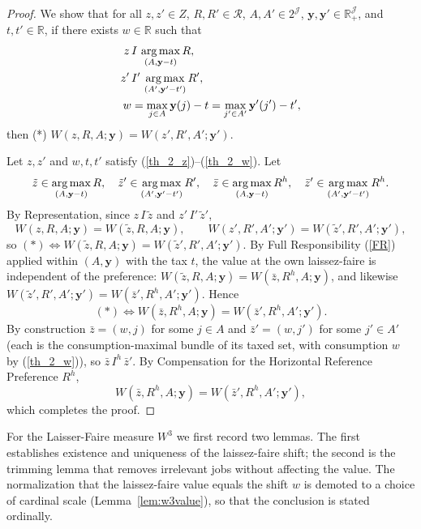 \begin{proof}
We show that for all $z,z'\in Z$, $R,R'\in\mathcal R$, $A,A'\in 2^{\mathcal J}$,
$\mathbf y,\mathbf y'\in\mathbb R_+^{\mathcal J}$, and $t,t'\in\mathbb R$, if
there exists $w\in\mathbb R$ such that
\begin{align}
z\,&I\,\operatorname*{arg\,max}_{(A,\mathbf y-t)}R, \label{th_2_z}\\
z'\,&I'\,\operatorname*{arg\,max}_{(A',\mathbf y'-t')}R', \label{th_2_zp}\\
w&=\max_{j\in A}\mathbf y(j)-t=\max_{j'\in A'}\mathbf y'(j')-t', \label{th_2_w}
\end{align}
then (*) $W(z,R,A;\mathbf y)=W(z',R',A';\mathbf y')$.

Let $z,z'$ and $w,t,t'$ satisfy (\ref{th_2_z})--(\ref{th_2_w}). Let
\begin{equation*}
\tilde z\in\operatorname*{arg\,max}_{(A,\mathbf y-t)}R,\quad
\tilde z'\in\operatorname*{arg\,max}_{(A',\mathbf y'-t')}R',\quad
\bar z\in\operatorname*{arg\,max}_{(A,\mathbf y-t)}R^h,\quad
\bar z'\in\operatorname*{arg\,max}_{(A',\mathbf y'-t')}R^h.
\end{equation*}
By Representation, since $z\,I\,\tilde z$ and $z'\,I'\,\tilde z'$,
\begin{equation*}
W(z,R,A;\mathbf y)=W(\tilde z,R,A;\mathbf y),\qquad
W(z',R',A';\mathbf y')=W(\tilde z',R',A';\mathbf y'),
\end{equation*}
so $(*)\Leftrightarrow W(\tilde z,R,A;\mathbf y)=W(\tilde z',R',A';\mathbf y')$.
By Full Responsibility (\ref{FR}) applied within $(A,\mathbf y)$ with the tax
$t$, the value at the own laissez-faire is independent of the preference:
$W(\tilde z,R,A;\mathbf y)=W(\bar z,R^h,A;\mathbf y)$, and likewise
$W(\tilde z',R',A';\mathbf y')=W(\bar z',R^h,A';\mathbf y')$. Hence
\begin{equation*}
(*)\Leftrightarrow W(\bar z,R^h,A;\mathbf y)=W(\bar z',R^h,A';\mathbf y').
\end{equation*}
By construction $\bar z=(w,j)$ for some $j\in A$ and $\bar z'=(w,j')$ for some
$j'\in A'$ (each is the consumption-maximal bundle of its taxed set, with
consumption $w$ by (\ref{th_2_w})), so $\bar z\,I^h\,\bar z'$. By Compensation
for the Horizontal Reference Preference $R^h$,
\begin{equation*}
W(\bar z,R^h,A;\mathbf y)=W(\bar z',R^h,A';\mathbf y'),
\end{equation*}
which completes the proof.
\end{proof}

For the Laisser-Faire measure $W^3$ we first record two lemmas. The first
establishes existence and uniqueness of the laissez-faire shift; the second is
the trimming lemma that removes irrelevant jobs without affecting the value. The
normalization that the laissez-faire value equals the shift $w$ is demoted to a
choice of cardinal scale (Lemma~\ref{lem:w3value}), so that the conclusion is
stated ordinally.

